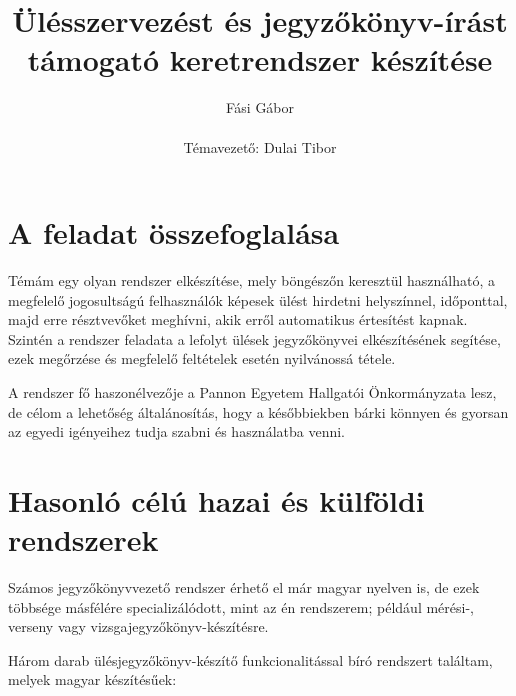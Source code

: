 \documentclass[a4paper,12pt,oneside]{report}
\title{\textbf{Ülésszervezést és jegyzőkönyv-írást támogató keretrendszer készítése}}
\author{Fási Gábor\\\\Témavezető: Dulai Tibor}
\date{}
\begin{document}
\setcounter{chapter}{1}

\maketitle

\listoftodos

\setcounter{secnumdepth}{3} %

\renewcommand{\thefigure}{\arabic{figure}}

\setcounter{tocdepth}{3} %
\tableofcontents
\thispagestyle{empty}
\pagebreak

\setcounter{page}{1} %
\section{A feladat összefoglalása}

Témám egy olyan rendszer elkészítése, mely böngészőn keresztül használható, a megfelelő jogosultságú felhasználók képesek ülést hirdetni helyszínnel, időponttal, majd erre résztvevőket meghívni, akik erről automatikus értesítést kapnak. Szintén a rendszer feladata a lefolyt ülések jegyzőkönyvei elkészítésének segítése, ezek megőrzése és megfelelő feltételek esetén nyilvánossá tétele.

A rendszer fő haszonélvezője a Pannon Egyetem Hallgatói Önkormányzata lesz, de célom a lehetőség általánosítás, hogy a későbbiekben bárki könnyen és gyorsan az egyedi igényeihez tudja szabni és használatba venni.

\section{Hasonló célú hazai és külföldi rendszerek}

Számos jegyzőkönyvvezető rendszer érhető el már magyar nyelven is, de ezek többsége másfélére specializálódott, mint az én rendszerem; például mérési-, verseny vagy vizsgajegyzőkönyv-készítésre.

Három darab ülésjegyzőkönyv-készítő funkcionalitással bíró rendszert találtam, melyek magyar készítésűek:
\end{document}
